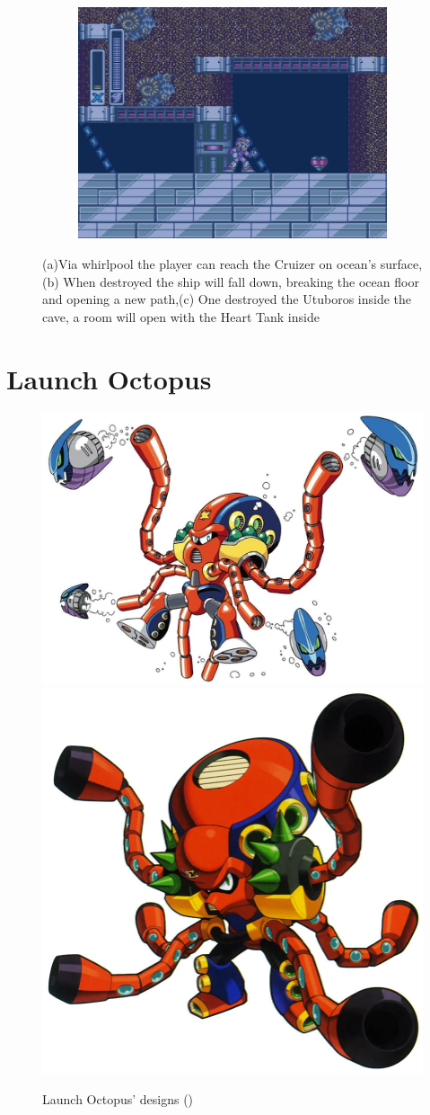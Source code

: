 \begin{figure}[htp]
\begin{subfigure}{0.4\textwidth}
		\includegraphics[width=\linewidth]{figures/X1/Launch_octopus/Octopus_heart_3.jpg}
		\caption{}
	\end{subfigure}
	\caption{(a)Via whirlpool the player can reach the Cruizer on ocean's surface,(b) When destroyed the ship will fall down, breaking the ocean floor and opening a new path,(c) One destroyed the Utuboros inside the cave, a room will open with the Heart Tank inside}
\end{figure}

\section{Launch Octopus}\label{boss:Launch_octopus}
\begin{figure}[htp]
	\centering
	\includegraphics[width=0.5\linewidth]{figures/X1/Launch_octopus/LaunchOctopus.jpg}
	\includegraphics[width=0.4\linewidth]{figures/X1/Launch_octopus/MHXLaunchOctopus.jpg}
	\caption{Launch Octopus' designs (\cite{book:MMX_Complete_art})}
\end{figure}

